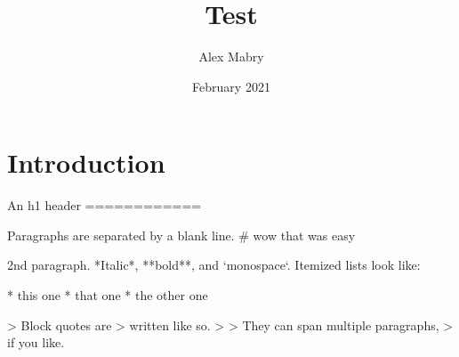 \documentclass{article}
\title{Test}
\author{Alex Mabry}
\date{February 2021}
\begin{document}
\maketitle


\section{Introduction}

\begin{markdown}
An h1 header
============

Paragraphs are separated by a blank line. 
# wow that was easy

2nd paragraph. *Italic*, **bold**, and `monospace`. Itemized lists
look like:

* this one
* that one
* the other one

> Block quotes are
> written like so.
>
> They can span multiple paragraphs,
> if you like.
\end{markdown}
\end{document}
